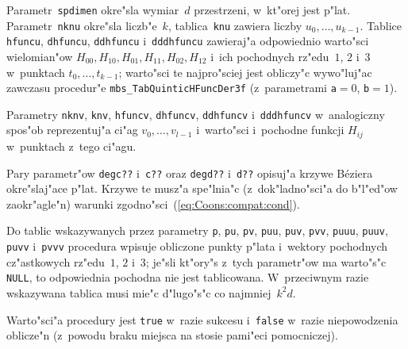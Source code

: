 \begin{sloppypar}
Parametr~\texttt{spdimen} okre"sla wymiar~$d$ przestrzeni, w~kt"orej jest
p"lat. Parametr~\texttt{nknu} okre"sla liczb"e~$k$, tablica~\texttt{knu}
zawiera liczby $u_0,\ldots,u_{k-1}$. Tablice \texttt{hfuncu},
\texttt{dhfuncu},
\texttt{ddhfuncu} i~\texttt{dddhfuncu} zawieraj"a odpowiednio warto"sci
wielomian"ow $H_{00},H_{10},H_{01},H_{11},H_{02},H_{12}$ i~ich pochodnych
rz"edu~$1$, $2$ i~$3$ w~punktach $t_0,\ldots,t_{k-1}$; warto"sci te
najpro"sciej jest obliczy"c wywo"luj"ac zawczasu procedur"e
\texttt{mbs\_TabQuinticHFuncDer3f} (z~parametrami \texttt{a}${}=0$,
\texttt{b}${}=1$).%
\end{sloppypar}

Parametry \texttt{nknv}, \texttt{knv}, \texttt{hfuncv}, \texttt{dhfuncv},
\texttt{ddhfuncv} i~\texttt{dddhfuncv} w~analogiczny spos"ob reprezentuj"a
ci"ag $v_0,\ldots,v_{l-1}$ i~warto"sci i~pochodne funkcji $H_{ij}$
w~punktach z~tego ci"agu.

Pary parametr"ow \texttt{degc??} i~\texttt{c??} oraz \texttt{degd??}
i~\texttt{d??} opisuj"a krzywe B\'{e}ziera okre"slaj"ace p"lat.
Krzywe te musz"a spe"lnia"c (z~dok"ladno"sci"a do b"l"ed"ow zaokr"agle"n)
warunki zgodno"sci~(\ref{eq:Coons:compat:cond}).

Do tablic wskazywanych przez parametry \texttt{p}, \texttt{pu}, \texttt{pv},
\texttt{puu}, \texttt{puv}, \texttt{pvv}, \texttt{puuu}, \texttt{puuv},
\texttt{puvv} i~\texttt{pvvv} procedura wpisuje obliczone punkty
p"lata i~wektory pochodnych cz"astkowych rz"edu~$1$, $2$ i~$3$; je"sli kt"ory"s
z~tych parametr"ow ma warto"s"c \texttt{NULL}, to odpowiednia pochodna
nie jest tablicowana. W~przeciwnym razie wskazywana tablica musi mie"c
d"lugo"s"c co najmniej~$k^2d$.

Warto"sci"a procedury jest \texttt{true} w~razie sukcesu i~\texttt{false}
w~razie niepowodzenia oblicze"n (z~powodu braku miejsca na stosie
pami"eci pomocniczej).


